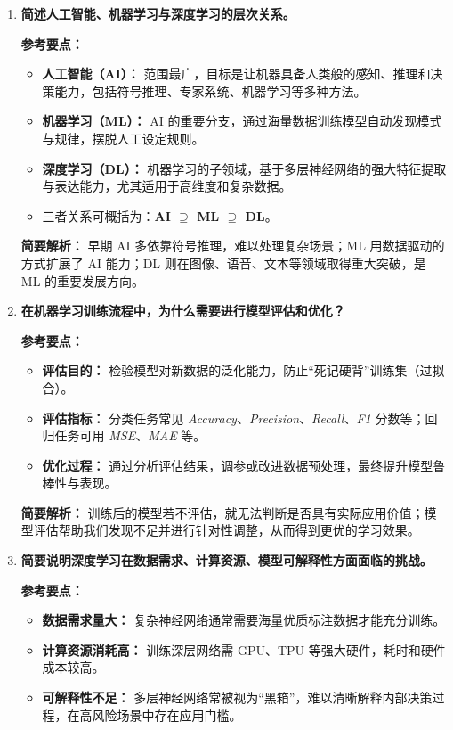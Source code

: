 \begin{enumerate}
  \item \textbf{简述人工智能、机器学习与深度学习的层次关系。}

  \textbf{参考要点：}
  \begin{itemize}
    \item \textbf{人工智能（AI）：} 范围最广，目标是让机器具备人类般的感知、推理和决策能力，包括符号推理、专家系统、机器学习等多种方法。
    \item \textbf{机器学习（ML）：} AI 的重要分支，通过海量数据训练模型自动发现模式与规律，摆脱人工设定规则。
    \item \textbf{深度学习（DL）：} 机器学习的子领域，基于多层神经网络的强大特征提取与表达能力，尤其适用于高维度和复杂数据。
    \item 三者关系可概括为：\textbf{AI $\supseteq$ ML $\supseteq$ DL}。
  \end{itemize}

  \textbf{简要解析：}
  早期 AI 多依靠符号推理，难以处理复杂场景；ML 用数据驱动的方式扩展了 AI 能力；DL 则在图像、语音、文本等领域取得重大突破，是 ML 的重要发展方向。

  \item \textbf{在机器学习训练流程中，为什么需要进行模型评估和优化？}

  \textbf{参考要点：}
  \begin{itemize}
    \item \textbf{评估目的：} 检验模型对新数据的泛化能力，防止“死记硬背”训练集（过拟合）。
    \item \textbf{评估指标：} 分类任务常见 \textit{Accuracy}、\textit{Precision}、\textit{Recall}、\textit{F1} 分数等；回归任务可用 \textit{MSE}、\textit{MAE} 等。
    \item \textbf{优化过程：} 通过分析评估结果，调参或改进数据预处理，最终提升模型鲁棒性与表现。
  \end{itemize}

  \textbf{简要解析：}
  训练后的模型若不评估，就无法判断是否具有实际应用价值；模型评估帮助我们发现不足并进行针对性调整，从而得到更优的学习效果。

  \item \textbf{简要说明深度学习在数据需求、计算资源、模型可解释性方面面临的挑战。}

  \textbf{参考要点：}
  \begin{itemize}
    \item \textbf{数据需求量大：} 复杂神经网络通常需要海量优质标注数据才能充分训练。
    \item \textbf{计算资源消耗高：} 训练深层网络需 GPU、TPU 等强大硬件，耗时和硬件成本较高。
    \item \textbf{可解释性不足：} 多层神经网络常被视为“黑箱”，难以清晰解释内部决策过程，在高风险场景中存在应用门槛。
  \end{itemize}


\end{enumerate}
